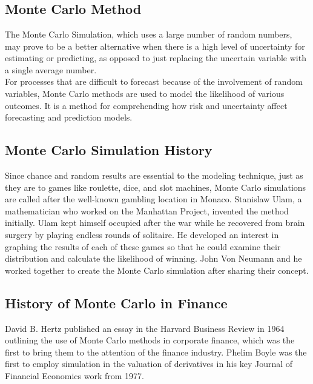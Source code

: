 
\chapter{}

\section{Monte Carlo Method}
\noindent The Monte Carlo Simulation, which uses a large number of random numbers, may prove to be a better alternative when there is a high level of uncertainty for estimating or predicting, as opposed to just replacing the uncertain variable with a single average number.\\[2mm]
For processes that are difficult to forecast because of the involvement of random variables, Monte Carlo methods are used to model the likelihood of various outcomes. It is a method for comprehending how risk and uncertainty affect forecasting and prediction models.
\section{Monte Carlo Simulation History}
Since chance and random results are essential to the modeling technique, just as they are to games like roulette, dice, and slot machines, Monte Carlo simulations are called after the well-known gambling location in Monaco.
Stanislaw Ulam, a mathematician who worked on the Manhattan Project, invented the method initially. Ulam kept himself occupied after the war while he recovered from brain surgery by playing endless rounds of solitaire. He developed an interest in graphing the results of each of these games so that he could examine their distribution and calculate the likelihood of winning. John Von Neumann and he worked together to create the Monte Carlo simulation after sharing their concept.
\section{History of Monte Carlo in Finance}
David B. Hertz published an essay in the Harvard Business Review in 1964 outlining the use of Monte Carlo methods in corporate finance, which was the first to bring them to the attention of the finance industry. Phelim Boyle was the first to employ simulation in the valuation of derivatives in his key Journal of Financial Economics work from 1977.\\[2mm]

